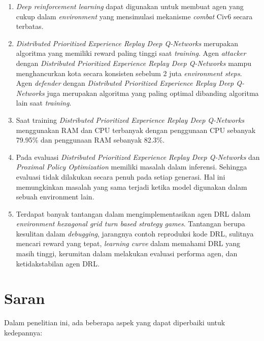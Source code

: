 \begin{enumerate}[nolistsep]

  \item \emph{Deep reinforcement learning} dapat digunakan untuk membuat agen yang cukup dalam \emph{environment} yang mensimulasi mekanisme \emph{combat}
  Civ6 secara terbatas.

  \item \emph{Distributed Prioritized Experience Replay Deep Q-Networks} merupakan algoritma yang memiliki reward paling tinggi saat \emph{training}. Agen \emph{attacker} dengan \emph{Distributed Prioritized Experience Replay Deep Q-Networks} mampu
  menghancurkan kota secara konsisten sebelum 2 juta \emph{environment steps}.
  Agen \emph{defender} dengan \emph{Distributed Prioritized Experience Replay Deep Q-Networks} juga merupakan algoritma yang paling optimal
  dibanding algoritma lain saat \emph{training}.

  \item Saat training \emph{Distributed Prioritized Experience Replay Deep Q-Networks} menggunakan RAM dan CPU terbanyak dengan penggunaan CPU sebanyak 79.95\% dan penggunaan
  RAM sebanyak 82.3\%.

  \item Pada evaluasi \emph{Distributed Prioritized Experience Replay Deep Q-Networks} dan \emph{Proximal Policy Optimization} memiliki masalah dalam inferensi.
  Sehingga evaluasi tidak dilakukan secara penuh pada setiap generasi. Hal ini memungkinkan masalah yang sama terjadi ketika model digunakan dalam sebuah environment lain.

  \item Terdapat banyak tantangan dalam mengimplementasikan agen DRL dalam \emph{environment hexagonal grid turn based strategy games}.
  Tantangan berupa kesulitan dalam \emph{debugging}, jarangnya contoh reproduksi kode DRL, sulitnya mencari reward yang tepat,
  \emph{learning curve} dalam memahami DRL yang masih tinggi, kerumitan dalam melakukan evaluasi performa agen,
  dan ketidakstabilan agen DRL. 
\end{enumerate}

\section{Saran}
\label{chap:saran}

Dalam penelitian ini, ada beberapa aspek yang dapat diperbaiki untuk kedepannya:

